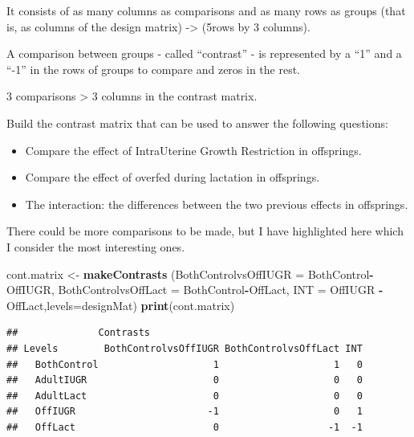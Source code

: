\documentclass[]{article}
\newenvironment{Shaded}{\begin{snugshade}}{\end{snugshade}}
\newcommand{\KeywordTok}[1]{\textcolor[rgb]{0.13,0.29,0.53}{\textbf{#1}}}
\newcommand{\DataTypeTok}[1]{\textcolor[rgb]{0.13,0.29,0.53}{#1}}
\newcommand{\StringTok}[1]{\textcolor[rgb]{0.31,0.60,0.02}{#1}}
\newcommand{\OperatorTok}[1]{\textcolor[rgb]{0.81,0.36,0.00}{\textbf{#1}}}
\newcommand{\NormalTok}[1]{#1}
\begin{document}
It consists of as many columns as comparisons and as many rows as groups
(that is, as columns of the design matrix) -\textgreater{} (5rows by 3
columns).

A comparison between groups - called ``contrast'' - is represented by a
``1'' and a ``-1'' in the rows of groups to compare and zeros in the
rest.

3 comparisons \textgreater{} 3 columns in the contrast matrix.

Build the contrast matrix that can be used to answer the following
questions:

\begin{itemize}
\item
  Compare the effect of IntraUterine Growth Restriction in offsprings.
\item
  Compare the effect of overfed during lactation in offsprings.
\item
  The interaction: the differences between the two previous effects in
  offsprings.
\end{itemize}

There could be more comparisons to be made, but I have highlighted here
which I consider the most interesting ones.

\begin{Shaded}
\begin{Highlighting}[]
\NormalTok{cont.matrix <-}\StringTok{ }\KeywordTok{makeContrasts}\NormalTok{ (}\DataTypeTok{BothControlvsOffIUGR =}\NormalTok{ BothControl}\OperatorTok{-}\NormalTok{OffIUGR,}
                              \DataTypeTok{BothControlvsOffLact =}\NormalTok{ BothControl}\OperatorTok{-}\NormalTok{OffLact,}
                              \DataTypeTok{INT =}\NormalTok{ OffIUGR }\OperatorTok{-}\StringTok{ }\NormalTok{OffLact,}\DataTypeTok{levels=}\NormalTok{designMat)}
\KeywordTok{print}\NormalTok{(cont.matrix)}
\end{Highlighting}
\end{Shaded}

\begin{verbatim}
##              Contrasts
## Levels        BothControlvsOffIUGR BothControlvsOffLact INT
##   BothControl                    1                    1   0
##   AdultIUGR                      0                    0   0
##   AdultLact                      0                    0   0
##   OffIUGR                       -1                    0   1
##   OffLact                        0                   -1  -1
\end{verbatim}
\end{document}
